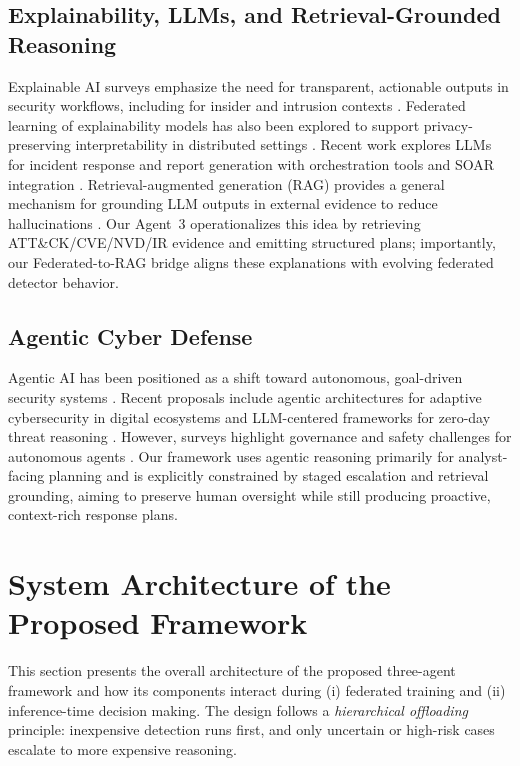 \documentclass[conference]{IEEEtran}
\begin{document}
\subsection{Explainability, LLMs, and Retrieval-Grounded Reasoning}
Explainable AI surveys emphasize the need for transparent, actionable outputs in security workflows, including for insider and intrusion contexts \cite{SHAP}. Federated learning of explainability models has also been explored to support privacy-preserving interpretability in distributed settings \cite{Timofte2023FedXAI}. Recent work explores LLMs for incident response and report generation with orchestration tools and SOAR integration \cite{Guduru}. Retrieval-augmented generation (RAG) provides a general mechanism for grounding LLM outputs in external evidence to reduce hallucinations \cite{Lewis2020RAG}. Our Agent~3 operationalizes this idea by retrieving ATT\&CK/CVE/NVD/IR evidence and emitting structured plans; importantly, our Federated-to-RAG bridge aligns these explanations with evolving federated detector behavior.

\subsection{Agentic Cyber Defense}
Agentic AI has been positioned as a shift toward autonomous, goal-driven security systems \cite{AgenticReview,AgenticCom}. Recent proposals include agentic architectures for adaptive cybersecurity in digital ecosystems \cite{Adcyber} and LLM-centered frameworks for zero-day threat reasoning \cite{Agentic1}. However, surveys highlight governance and safety challenges for autonomous agents \cite{SecAgentic,MCP}. Our framework uses agentic reasoning primarily for analyst-facing planning and is explicitly constrained by staged escalation and retrieval grounding, aiming to preserve human oversight while still producing proactive, context-rich response plans.

\section{System Architecture of the Proposed Framework}
\label{sec:system_architecture}

This section presents the overall architecture of the proposed three-agent framework and how its components interact during (i) federated training and (ii) inference-time decision making. The design follows a \emph{hierarchical offloading} principle: inexpensive detection runs first, and only uncertain or high-risk cases escalate to more expensive reasoning.
\end{document}
